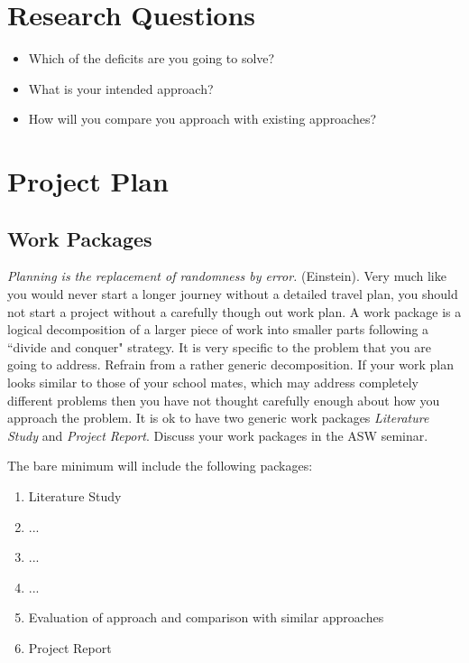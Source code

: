 \documentclass[rnd]{mas_proposal}
\begin{document}
\section{Research Questions}
\begin{itemize}
    \item Which of the deficits are you going to solve?
    \item What is your intended approach?
    \item How will you compare you approach with existing approaches?
\end{itemize}

\section{Project Plan}

\subsection{Work Packages}
\emph{Planning is the replacement of randomness by error.} (Einstein). Very much like you would never start a longer journey without a detailed travel plan, you should not start a project without a carefully though out work plan. A work package is a logical decomposition of a larger piece of work into smaller parts following a ``divide and conquer" strategy. It is very specific to the problem that you are going to address. Refrain from a rather generic decomposition. If your work plan looks similar to those of your school mates, which may address completely different problems then you have not thought carefully enough about how you approach the problem. It is ok to have two generic work packages \emph{Literature Study} and \emph{Project Report}. Discuss your work packages in the ASW seminar.

The bare minimum will include the following packages:
\begin{enumerate}
    \item[WP1] Literature Study
    \item[WP2] ...
    \item[WP3] ...
    \item  ...
    \item[WPy] Evaluation of approach and comparison with similar approaches
    \item[WPz] Project Report
\end{enumerate}
\end{document}
